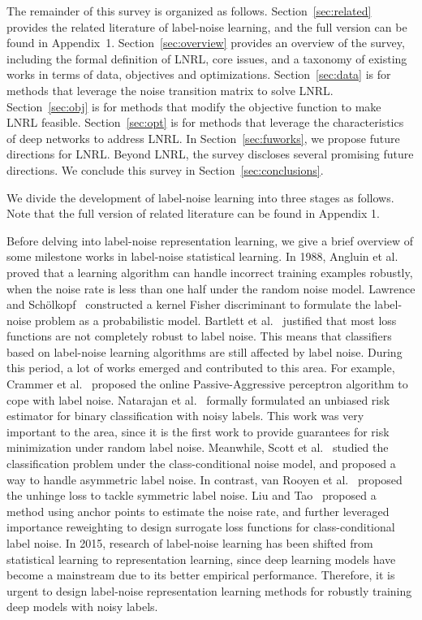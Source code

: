 The remainder of this survey is organized as follows. Section~\ref{sec:related} provides the related literature of label-noise learning, and the full version can be found in Appendix~1.
Section~\ref{sec:overview} provides an overview of the survey, 
including the formal definition of LNRL, core issues, and a taxonomy of existing works in terms of data, objectives and optimizations.
Section~\ref{sec:data} is for methods that leverage the noise transition matrix to solve LNRL. 
Section~\ref{sec:obj} is for methods that modify the objective function to make LNRL feasible. 
Section~\ref{sec:opt} is for methods that leverage the characteristics of deep networks to address LNRL. 
In Section~\ref{sec:fuworks}, we propose future directions for LNRL. Beyond LNRL, the survey discloses several promising future directions. We conclude this survey in Section~\ref{sec:conclusions}.

\label{sec:related}
We divide the development of label-noise learning into three stages as follows. Note that the full version of related literature can be found in Appendix 1.

Before delving into label-noise representation learning, 
we give a brief overview of some milestone works in label-noise statistical learning. In 1988, Angluin et al.~ proved that a learning algorithm can handle incorrect training examples robustly, when the noise rate is less than one half under the random noise model. Lawrence and Sch\"olkopf~ constructed a kernel Fisher discriminant to formulate the label-noise problem as a probabilistic model. Bartlett et al.~ justified that most loss functions are not completely robust to label noise. This means that classifiers based on label-noise learning algorithms are still affected by label noise.
During this period, a lot of works emerged and contributed to this area. For example, Crammer et al.~ proposed the online Passive-Aggressive perceptron algorithm to cope with label noise. Natarajan et al.~ formally formulated an unbiased risk estimator for binary classification with noisy labels. This work was very important to the area, since it is the first work to provide guarantees for risk minimization under random label noise. Meanwhile, Scott et al.~ studied the classification problem under the class-conditional noise model, and proposed a way to handle asymmetric label noise. In contrast, van Rooyen et al.~ proposed the unhinge loss to tackle symmetric label noise. Liu and Tao~ proposed a method using anchor points to estimate the noise rate, and further leveraged importance reweighting to design surrogate loss functions for class-conditional label noise.
In 2015, research of label-noise learning has been shifted from statistical learning to representation learning, since deep learning models have become a mainstream due to its better empirical performance. Therefore, it is urgent to design label-noise representation learning methods for robustly training deep models with noisy labels.

